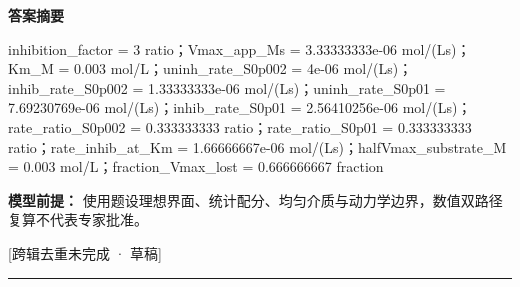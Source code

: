 \documentclass[UTF8,11pt,a4paper]{ctexart}
\begin{document}
\noindent\textbf{答案摘要}\par
inhibition\_factor = 3 ratio；Vmax\_app\_Ms = 3.33333333e-06 mol/(Ls)；Km\_M = 0.003 mol/L；uninh\_rate\_S0p002 = 4e-06 mol/(Ls)；inhib\_rate\_S0p002 = 1.33333333e-06 mol/(Ls)；uninh\_rate\_S0p01 = 7.69230769e-06 mol/(Ls)；inhib\_rate\_S0p01 = 2.56410256e-06 mol/(Ls)；rate\_ratio\_S0p002 = 0.333333333 ratio；rate\_ratio\_S0p01 = 0.333333333 ratio；rate\_inhib\_at\_Km = 1.66666667e-06 mol/(Ls)；halfVmax\_substrate\_M = 0.003 mol/L；fraction\_Vmax\_lost = 0.666666667 fraction\par
\noindent\textbf{模型前提：}
使用题设理想界面、统计配分、均匀介质与动力学边界，数值双路径复算不代表专家批准。\par
\noindent\textcolor{red!65!black}{[跨辑去重未完成 · 草稿]} \par
\medskip\hrule\medskip
{}
\end{document}
